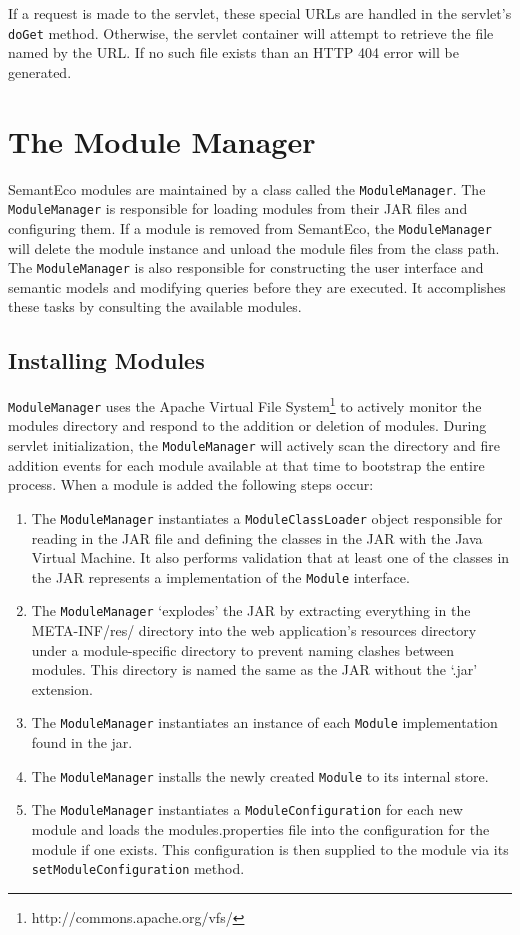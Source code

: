 \documentclass[letterpaper]{report}
\begin{document}
\noindent If a request is made to the servlet, these special URLs are handled in the servlet's \texttt{doGet} method. Otherwise, the servlet container will attempt to retrieve the file named by the URL. If no such file exists than an HTTP 404 error will be generated.

\section{The Module Manager}
\label{module-manager}
SemantEco modules are maintained by a class called the \texttt{ModuleManager}. The \texttt{ModuleManager} is responsible for loading modules from their JAR files and configuring them. If a module is removed from SemantEco, the \texttt{ModuleManager} will delete the module instance and unload the module files from the class path. The \texttt{ModuleManager} is also responsible for constructing the user interface and semantic models and modifying queries before they are executed. It accomplishes these tasks by consulting the available modules.

\subsection{Installing Modules}
\texttt{ModuleManager} uses the Apache Virtual File System\footnote{http://commons.apache.org/vfs/} to actively monitor the modules directory and respond to the addition or deletion of modules. During servlet initialization, the \texttt{ModuleManager} will actively scan the directory and fire addition events for each module available at that time to bootstrap the entire process. When a module is added the following steps occur:

\begin{enumerate}
\item The \texttt{ModuleManager} instantiates a \texttt{ModuleClassLoader} object responsible for reading in the JAR file and defining the classes in the JAR with the Java Virtual Machine. It also performs validation that at least one of the classes in the JAR represents a implementation of the \texttt{Module} interface.
\item The \texttt{ModuleManager} `explodes' the JAR by extracting everything in the META-INF/res/ directory into the web application's resources directory under a module-specific directory to prevent naming clashes between modules. This directory is named the same as the JAR without the `.jar' extension.
\item The \texttt{ModuleManager} instantiates an instance of each \texttt{Module} implementation found in the jar.
\item The \texttt{ModuleManager} installs the newly created \texttt{Module} to its internal store.
\item The \texttt{ModuleManager} instantiates a \texttt{ModuleConfiguration} for each new module and loads the modules.properties file into the configuration for the module if one exists. This configuration is then supplied to the module via its \texttt{setModuleConfiguration} method.
\end{enumerate}
\end{document}
